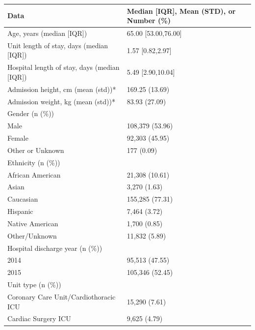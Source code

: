 \documentclass[english]{article}
\begin{document}
\begin{table}
\begin{tabular}{l|p{7cm}}
Data & Median [IQR], Mean (STD), or Number (\%) \\  \hline
Age, years (median [IQR]) & 65.00 [53.00,76.00] \\
Unit length of stay, days (median [IQR]) & 1.57
[0.82,2.97] \\
Hospital length of stay, days (median [IQR]) & 5.49
[2.90,10.04] \\
Admission height, cm (mean (std))* & 169.25 (13.69) \\
Admission weight, kg (mean (std))* & 83.93 (27.09) \\
Gender (n (\%)) & \\
\hspace{0.5cm} Male & 108,379 (53.96) \\
\hspace{0.5cm} Female & 92,303 (45.95) \\
\hspace{0.5cm} Other or Unknown & 177 (0.09) \\
Ethnicity (n (\%)) & \\
\hspace{0.5cm} African American & 21,308 (10.61) \\
\hspace{0.5cm} Asian & 3,270 (1.63) \\
\hspace{0.5cm} Caucasian & 155,285 (77.31) \\
\hspace{0.5cm} Hispanic & 7,464 (3.72) \\
\hspace{0.5cm} Native American & 1,700 (0.85) \\
\hspace{0.5cm} Other/Unknown & 11,832 (5.89) \\
Hospital discharge year (n (\%)) & \\
\hspace{0.5cm} 2014 & 95,513 (47.55) \\
\hspace{0.5cm} 2015 & 105,346 (52.45) \\
Unit type (n (\%)) & \\
\hspace{0.5cm} Coronary Care Unit/Cardiothoracic ICU & 15,290 (7.61) \\
\hspace{0.5cm} Cardiac Surgery ICU & 9,625 (4.79) \\

\end{tabular}
\end{table}
\end{document}
